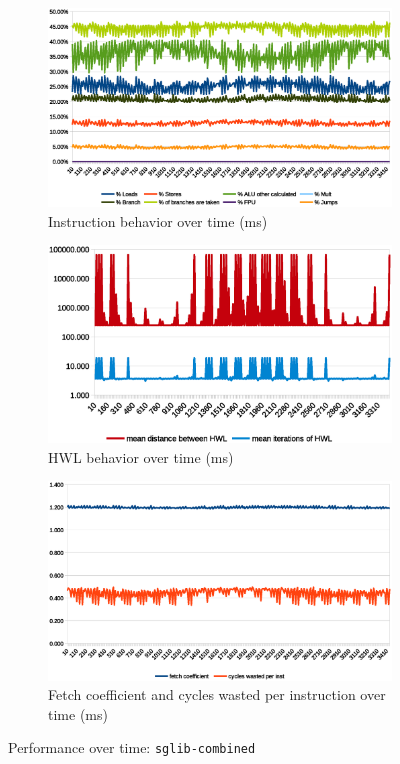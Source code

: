 \documentclass[../bachelor_paper.tex]{subfiles}
\begin{document}
\begin{figure}
    \begin{subfigure}{0.45\textwidth}
        \includegraphics[width=\textwidth]{img/graph/embench/sglib-combined_inst.eps}
        \caption{Instruction behavior over time (ms)}
    \end{subfigure}
    \begin{subfigure}{0.45\textwidth}
        \includegraphics[width=\textwidth]{img/graph/embench/sglib-combined_hwl.eps}
        \caption{\ac{HWL} behavior over time (ms)}
    \end{subfigure}
    \begin{subfigure}{0.45\textwidth}
        \includegraphics[width=\textwidth]{img/graph/embench/sglib-combined_fetch_waste.eps}
        \caption{Fetch coefficient and cycles wasted per instruction over time (ms)}
    \end{subfigure}
    \caption{Performance over time: \texttt{sglib-combined}}
\end{figure}
\end{document}
